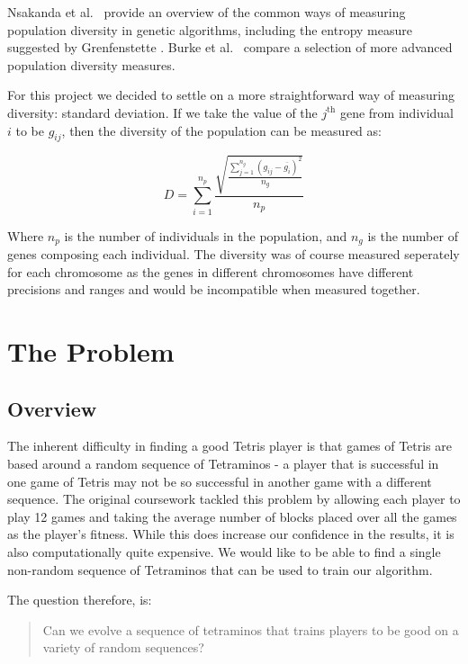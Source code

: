 \documentclass[a4paper,11pt]{article}
\begin{document}
Nsakanda et al.\ \cite{nsakanda2007ensuring} provide an overview of the common
ways of measuring population diversity in genetic algorithms, including the
entropy measure suggested by Grenfenstette \cite{grefenstette1987incorporating}.
Burke et al.\ \cite{burke2003advanced} compare a selection of more advanced
population diversity measures.

For this project we decided to settle on a more straightforward way of measuring
diversity: standard deviation.
If we take the value of the $j^\textrm{th}$ gene from individual $i$ to be
$g_{ij}$, then the diversity of the population can be measured as:

\begin{equation}
  D = \sum_{i=1}^{n_p} \frac{\sqrt{\frac{\sum_{j=1}^{n_g} (g_{ij} - \overline{g_i})^2 }{n_g}} }{n_p}
\end{equation}

Where $n_p$ is the number of individuals in the population, and $n_g$ is the
number of genes composing each individual.
The diversity was of course measured seperately for each chromosome as the
genes in different chromosomes have different precisions and ranges and would be
incompatible when measured together.

\section{The Problem}

\subsection{Overview}

The inherent difficulty in finding a good Tetris player is that games of
Tetris are based around a random sequence of Tetraminos - a player that is
successful in one game of Tetris may not be so successful in another game with
a different sequence.
The original coursework tackled this problem by allowing each player to play
12 games and taking the average number of blocks placed over all the games as
the player's fitness.
While this does increase our confidence in the results, it is also
computationally quite expensive.
We would like to be able to find a single non-random sequence of Tetraminos
that can be used to train our algorithm.

The question therefore, is:

\begin{quote}
  Can we evolve a sequence of tetraminos that trains players to be good on a
  variety of random sequences?
\end{quote}
\end{document}
